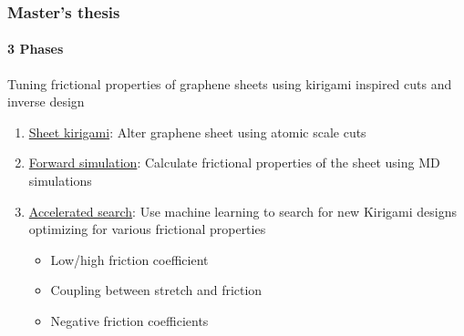 \documentclass[
	10pt, %
]{beamer}
\begin{document}
\begin{frame}
	\frametitle{Master's thesis}
	\framesubtitle{3 Phases}

	{\large Tuning frictional properties of graphene sheets using kirigami inspired cuts and inverse design}
	\newline
	
	\begin{enumerate}
		\setlength\itemsep{2em}
		\item \underline{Sheet kirigami}: Alter graphene sheet using atomic scale cuts %
		\item \underline{Forward simulation}: Calculate frictional properties of the sheet using MD simulations
		\item \underline{Accelerated search}: Use machine learning to search for new Kirigami designs optimizing for various frictional properties
		\begin{itemize}
			\item Low/high friction coefficient
			\item Coupling between stretch and friction
			\item Negative friction coefficients
		\end{itemize} 
	\end{enumerate}
\end{frame}
\end{document}
